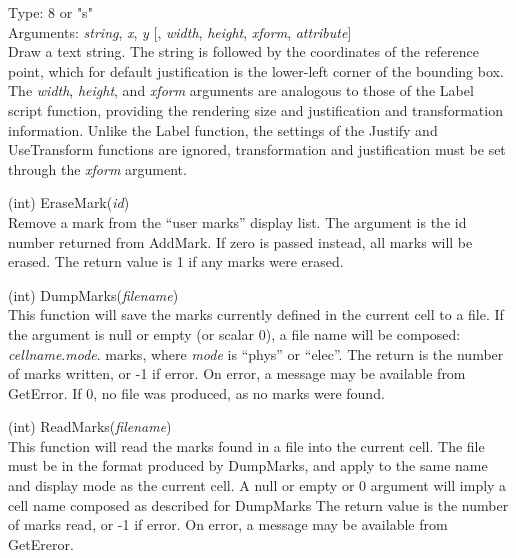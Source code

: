 \begin{description}
\begin{description}
\item{Type: 8 or {\vt "s"}\\
Arguments: {\it string\/}, {\it x\/}, {\it y\/} [, {\it width\/},
    {\it height\/}, {\it xform\/}, {\it attribute\/}]}\\
  Draw a text string.  The string is followed by the coordinates of
  the reference point, which for default justification is the
  lower-left corner of the bounding box.  The {\it width\/}, {\it
  height\/}, and {\it xform\/} arguments are analogous to those of the
  {\vt Label} script function, providing the rendering size and
  justification and transformation information.  Unlike the {\vt
  Label} function, the settings of the {\vt Justify} and {\vt
  UseTransform} functions are ignored, transformation and
  justification must be set through the {\it xform} argument.
\end{description}

\item{(int) \vt EraseMark({\it id\/})}\\
Remove a mark from the ``user marks'' display list.  The argument is
the id number returned from {\vt AddMark}.  If zero is passed instead,
all marks will be erased.  The return value is 1 if any marks were
erased.

\item{(int) \vt DumpMarks({\it filename\/})}\\
This function will save the marks currently defined in the current
cell to a file.  If the argument is null or empty (or scalar 0), a
file name will be composed:  {\it cellname\/}.{\it mode\/}.{\vt
marks}, where {\it mode} is ``{\vt phys}'' or ``{\vt elec}''.  The
return is the number of marks written, or -1 if error.  On error, a
message may be available from {\vt GetError}.  If 0, no file was
produced, as no marks were found.

\item{(int) \vt ReadMarks({\it filename\/})}\\
This function will read the marks found in a file into the current
cell.  The file must be in the format produced by {\vt DumpMarks}, and
apply to the same name and display mode as the current cell.  A null
or empty or 0 argument will imply a cell name composed as described
for {\vt DumpMarks} The return value is the number of marks read, or
-1 if error.  On error, a message may be available from {\vt
GetEreror}.

\end{description}


